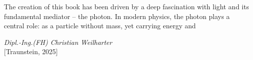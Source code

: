 The creation of this book has been driven by a deep fascination with light and its fundamental mediator – the photon. In modern physics, the photon plays a central role: as a particle without mass, yet carrying energy and 

\begin{flushright}
	\textit{Dipl.-Ing.(FH) Christian Weilharter} \\
	\vspace{0.5em}
	[Traunstein, 2025]
\end{flushright}
